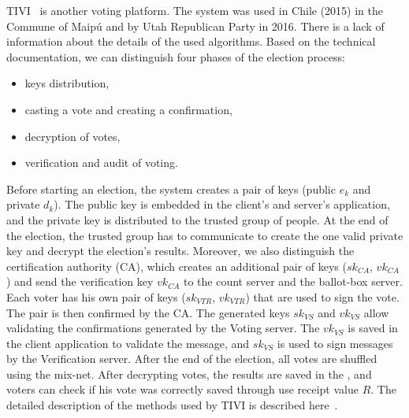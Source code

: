 \documentclass[applsci,article,submit,moreauthors,pdftex]{Definitions/mdpi}
\begin{document}
TIVI~\cite{tivi:online} is another voting platform. The system was used in Chile (2015) in the Commune of Maipú and by Utah Republican Party in 2016. There is a lack of information about the details of the used algorithms. Based on the technical documentation, we can distinguish four phases of the election process:
\begin{itemize}
    \item keys distribution,
    \item casting a vote and creating a confirmation,
    \item decryption of votes,
    \item verification and audit of voting.
\end{itemize}
Before starting an election, the system creates a pair of keys (public $e_k$ and private $d_k$). The public key is embedded in the client's and server's application, and the private key is distributed to the trusted group of people. At the end of the election, the trusted group has to communicate to create the one valid private key and decrypt the election's results. 
Moreover, we also distinguish the certification authority (CA), which creates an additional pair of keys ($sk_{CA}$, $vk_{CA}$) and send the verification key $vk_{CA}$ to the count server and the ballot-box server. Each voter has his own pair of keys ($sk_{VTR}$, $vk_{VTR}$) that are used to sign the vote. The pair is then confirmed by the CA.
The generated keys $sk_{VS}$ and $vk_{VS}$ allow validating the confirmations generated by the Voting server. The $vk_{VS}$ is saved in the client application to validate the message, and $sk_{VS}$ is used to sign messages by the Verification server. After the end of the election, all votes are shuffled using the mix-net. After decrypting votes, the results are saved in the , and voters can check if his vote was correctly saved through use receipt value $R$. The detailed description of the methods used by TIVI is described here~\cite{tivi:krips2018internet}.


\end{document}
